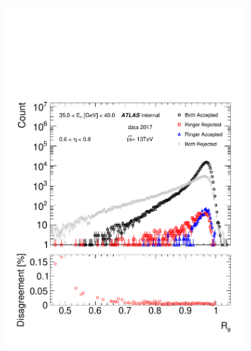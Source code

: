 \begin{figure}[h!]
\begin{subfigure}[c]{.49\textwidth}
\includegraphics[width=\textwidth]{sections/05_analysis/figures/quadrant_plots/rphi.pdf}
\caption{}
\end{subfigure} 
\begin{subfigure}[c]{.49\textwidth}
\centering

\end{subfigure}
\end{figure}
